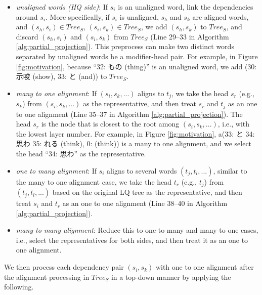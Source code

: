 \documentclass[english]{jnlp_1.4}
\begin{document}
\begin{itemize}
\item
{\it unaligned words (HQ side)}: If $s_i$ is an unaligned word, link the dependencies around $s_i$. 
More specifically, if $s_i$ is unaligned{, $s_h$ and $s_k$ are aligned words}, and $(s_h, s_i) \in Tree_S$, $(s_i, s_k) \in Tree_S$, we 
add $(s_h, s_k)$ to $Tree_S$, and discard $(s_h, s_i)$ and $(s_i, s_k)$ from $Tree_S$ {(Line 29--33 in 
Algorithm \ref{alg:partial_projection})}. This preprocess can make two 
distinct words separated by unaligned words be a modifier-head pair. For example, in Figure \ref{fig:motivation}, because ``32: もの (thing)''
is an unaligned word, we add (30: 示唆 (show), 33: と (and)) to $Tree_S$.
\item
{\it many to one alignment}: If $(s_i,s_k,...)$ aligns to $t_j$, 
we take the head $s_r$ (e.g., $s_k$) from $(s_i,s_k,...)$ as the representative, 
and then treat $s_r$ and $t_j$ as an one to one alignment {(Line 35--37 in Algorithm \ref{alg:partial_projection})}.
The head $s_r$ is the node that is closest to the root among $(s_i,s_k,...)${, i.e., with the lowest layer number}.
For example, in Figure \ref{fig:motivation}, a(33: と 34: 思わ 35: れる (think), 
0:  (think)) is a many to one alignment, and we select the head ``34: 思わ'' as the representative.
\item
{\it one to many alignment}: If $s_i$ aligns to several words $(t_j,t_l,...)$, similar to the many 
to one alignment case, we take the head $t_r$ (e.g., $t_j$) from $(t_j, t_l,...)$ based on the original LQ tree as the representative, 
and then treat $s_i$ and $t_r$ as an one to one alignment {(Line 38--40 in Algorithm \ref{alg:partial_projection})}.
\item
{\it many to many alignment}: Reduce this to one-to-many and many-to-one cases, i.e., select the 
representatives for both sides,
{and then treat it as an one to one alignment.}
\end{itemize}

We then process each {dependency pair $(s_i,s_k)$ with one to one alignment after the 
alignment processing} in $Tree_S$ in a top-down manner by applying the following.
\end{document}
